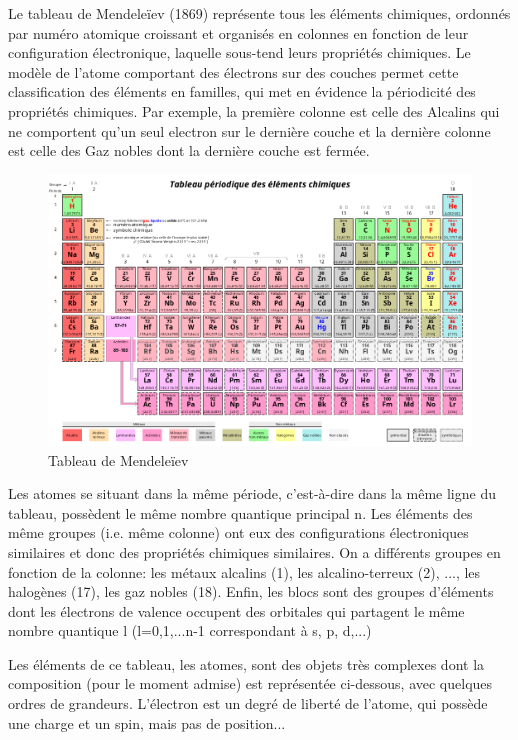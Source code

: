 Le tableau de Mendeleïev (1869) représente tous les éléments chimiques, ordonnés par numéro atomique croissant et organisés en colonnes en fonction de leur configuration électronique, laquelle sous-tend leurs propriétés chimiques.  Le modèle de l'atome comportant des électrons sur des couches permet cette classification des éléments en familles, qui met en évidence la périodicité des propriétés chimiques. Par exemple, la première colonne est celle des Alcalins qui ne comportent qu'un seul electron sur le dernière couche et la dernière colonne est celle des Gaz nobles dont la dernière couche est fermée. 

\begin{figure}[ht]
    \centering
    \includegraphics[scale=0.40]{Images1/mend.png}
    \caption{Tableau de Mendeleïev}
\end{figure}

Les atomes se situant dans la même période, c'est-à-dire dans la même ligne du tableau, possèdent le même nombre quantique principal n. Les éléments des même groupes (i.e. même colonne) ont eux des configurations électroniques similaires et donc des propriétés chimiques similaires. On a différents groupes en fonction de la colonne: les métaux alcalins (1), les alcalino-terreux (2), ..., les halogènes (17), les gaz nobles (18). Enfin, les blocs sont des groupes d'éléments dont les électrons de valence occupent des orbitales qui partagent le même nombre quantique l (l=0,1,...n-1 correspondant à s, p, d,...)


Les éléments de ce tableau, les atomes, sont des objets très complexes dont la composition (pour le moment admise) est représentée ci-dessous, avec quelques ordres de grandeurs. L'électron est un degré de liberté de l'atome, qui possède une charge et un spin, mais pas de position...

